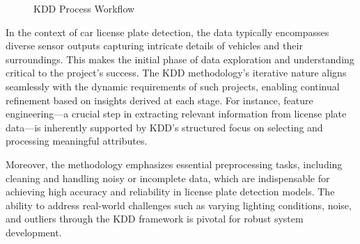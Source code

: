 \begin{figure}[h]
	\caption{KDD Process Workflow \cite{Wings23}}
	\label{fig:KDD} %
\end{figure}




\newpage



In the context of car license plate detection, the data typically encompasses diverse sensor outputs capturing intricate details of vehicles and their surroundings. This makes the initial phase of data exploration and understanding critical to the project's success. The KDD methodology’s iterative nature aligns seamlessly with the dynamic requirements of such projects, enabling continual refinement based on insights derived at each stage. For instance, feature engineering—a crucial step in extracting relevant information from license plate data—is inherently supported by KDD's structured focus on selecting and processing meaningful attributes. 

Moreover, the methodology emphasizes essential preprocessing tasks, including cleaning and handling noisy or incomplete data, which are indispensable for achieving high accuracy and reliability in license plate detection models. The ability to address real-world challenges such as varying lighting conditions, noise, and outliers through the KDD framework is pivotal for robust system development.

